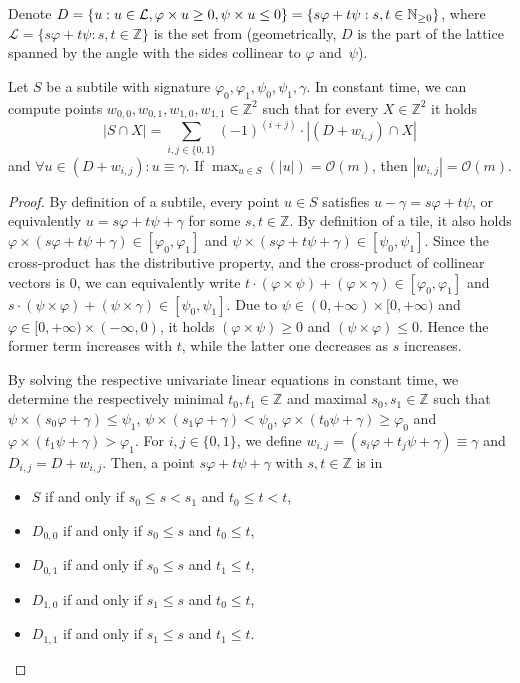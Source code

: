 \documentclass[twoside,leqno]{article}
\renewcommand{\O}{\mathcal{O}}
\renewcommand{\L}{\mathcal{L}}
\renewcommand{\phi}{\varphi}
\newcommand{\set}[1]{\left\lbrace #1 \right\rbrace}
\newcommand{\absolute}[1]{\left\lvert#1\right\rvert}
\begin{document}
Denote $D = \set{u : u \in \L, \h{u} \ge 0, \s{u} \le 0} = \{ s\phi + t\psi : s,t \in \mathbb N_{\geq 0}\}$, where $\L = \{ s\phi + t\psi : s,t \in \mathbb Z\}$ is the set from  (geometrically, $D$ is the part of the lattice spanned by the angle with the sides collinear to $\phi$ and~$\psi$).

\begin{lemma}\label{primitive}
Let $S$ be a subtile with signature $\phi_0, \phi_1, \psi_0, \psi_1, \gamma$. In constant time, we can compute points $w_{0,0},w_{0,1},w_{1,0},w_{1,1} \in \mathbb Z^2$ such that for every $X \in \mathbb Z^2$ it holds
\[ \absolute{S \cap X} = \sum_{i,j \in \{0,1\}} (-1)^{(i+j)} \cdot \absolute{(D + w_{i,j}) \cap X}\]
and $\forall u \in (D + w_{i,j}) : u \equiv \gamma$. If $\max_{u \in S}(\absolute{u}) = \O(m)$, then $\absolute{w_{i,j}} = \O(m)$.

\begin{proof}
By definition of a subtile, every point $u \in S$ satisfies $u - \gamma = s\phi + t\psi$, or equivalently $u = s\phi + t\psi + \gamma$ for some $s,t\in\mathbb Z$. 
By definition of a tile, it also holds $\phi \times (s\phi + t\psi + \gamma) \in [\phi_0, \phi_1]$ and $\psi \times (s\phi + t\psi + \gamma) \in [\psi_0, \psi_1]$. Since the cross-product has the distributive property, and the cross-product of collinear vectors is $0$, we can equivalently write $t \cdot (\phi \times \psi) + (\phi \times \gamma) \in [\phi_0, \phi_1]$ and $s \cdot (\psi \times \phi) + (\psi \times \gamma) \in [\psi_0, \psi_1]$. 
Due to $\psi \in (0, +\infty) \times [0, +\infty)$ and $\phi \in [0, +\infty) \times (-\infty, 0)$, it holds $(\phi \times \psi) \geq 0$ and $(\psi \times \phi) \leq 0$. Hence the former term increases with $t$, while the latter one decreases as $s$ increases.

By solving the respective univariate linear equations in constant time, we determine the respectively minimal $t_0, t_1 \in \mathbb Z$ and maximal $s_0, s_1 \in \mathbb Z$ such that $\psi \times (s_0\phi + \gamma) \leq \psi_1$, $\psi \times (s_1\phi + \gamma) < \psi_0$, $\phi \times (t_0\psi + \gamma) \geq \phi_0$ and $\phi \times (t_1\psi + \gamma) > \phi_1$.
For $i,j \in \{0, 1\}$, we define $w_{i, j} = (s_i\phi + t_j\psi + \gamma) \equiv \gamma$ and $D_{i,j} = D + w_{i,j}$. 
Then, a point $s\phi + t\psi + \gamma$ with $s,t \in \mathbb Z$ is in 
\begin{itemize}
	\item $S$ if and only if $s_0 \leq s < s_1$ and $t_0 \leq t < t$, 
	\item $D_{0, 0}$ if and only if $s_0 \leq s$ and $t_0 \leq t$, 
	\item $D_{0, 1}$ if and only if $s_0 \leq s$ and $t_1 \leq t$, 
	\item $D_{1, 0}$ if and only if $s_1 \leq s$ and $t_0 \leq t$, 
	\item $D_{1, 1}$ if and only if $s_1 \leq s$ and $t_1 \leq t$.
\end{itemize}


\end{proof}
\end{lemma}
\end{document}
